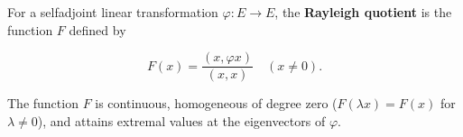 For a selfadjoint linear transformation $\varphi: E \rightarrow E$, the \textbf{Rayleigh quotient} is the function $F$ defined by

$$F(x) = \frac{(x, \varphi x)}{(x, x)} \quad (x \neq 0).$$

The function $F$ is continuous, homogeneous of degree zero ($F(\lambda x) = F(x)$ for $\lambda \neq 0$), and attains extremal values at the eigenvectors of $\varphi$.

